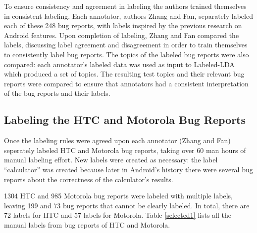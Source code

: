 \documentclass[10pt, conference, compsocconf]{IEEEtran}
\begin{document}
To ensure consistency and agreement in labeling the authors trained
themselves in consistent labeling.
Each annotator, authors Zhang and Fan, separately labeled each of these 248 bug reports, 
with labels inspired by the previous research on Android
features. 
Upon completion of labeling, 
 Zhang and Fan compared the labels,
discussing label agreement and
disagreement in order to train themselves to consistently label bug
reports.
The topics of the labeled bug reports were also compared: each annotator's labeled data was used as input to
 Labeled-LDA which produced a set of topics.
The resulting test topics and their relevant bug reports were compared to ensure
that annotators had a 
consistent interpretation of the bug reports and their labels.




\subsection{Labeling the HTC and Motorola Bug Reports}

Once the labeling rules were agreed upon each annotator (Zhang and Fan)
seperately labeled HTC and Motorola bug reports, taking over 60 man
hours of manual labeling effort.
New labels were created as necessary: the label ``calculator'' was created because later in
Android's history there were 
several bug reports about the correctness of the
calculator's results. 


1304 HTC and 985 Motorola bug reports were labeled with multiple
labels, leaving 199 and 73 bug reports that cannot be clearly labeled.
In total, there are 72 labels for HTC and 57 labels for Motorola.
Table \ref{selected1} lists all the manual labels from bug reports of HTC
and Motorola.
\end{document}
